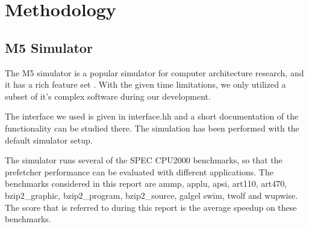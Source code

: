 \section{Methodology}

\subsection{M5 Simulator}

The M5 simulator is a popular simulator for computer architecture research, and
it has a rich feature set \cite{user_doc}. With the given time limitations, we only utilized a
subset of it’s complex software during our development.


The interface we used is given in interface.hh and a short documentation of the
functionality can be studied there. The simulation has been performed with the
default simulator setup.



The simulator runs several of the SPEC CPU2000 benchmarks, so that the prefetcher
performance can be evaluated with different applications.
The benchmarks considered in this report are ammp, applu, apsi, art110, art470,
bzip2\_graphic, bzip2\_program, bzip2\_source, galgel swim, twolf and wupwise.
The score that is referred to during this report is the average speedup on these benchmarks.


